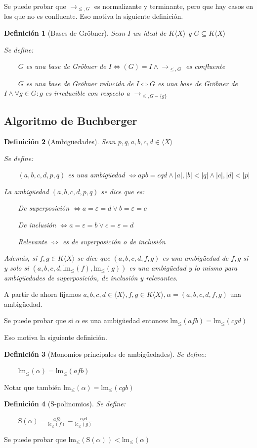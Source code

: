 \documentclass{amsbook}
\theoremstyle{customstyle}
\newtheorem{definition}{Definición}[section]
\newcommand{\definición}[2][]{
  \begin{definition}[#1]
  \setlength{\parindent}{2em} %
  #2
  \end{definition}
}
\begin{document}
Se puede probar que $→_{≤, G}$ es normalizante y terminante, pero que hay casos en los que no es confluente. Eso motiva la siguiente definición.

\definición[Bases de Gröbner] {
Sean $I$ un ideal de $K⟨X⟩$ y $G ⊆ K⟨X⟩$

Se define:

    $G$ es una base de Gröbner de $I ⇔ (G) = I ∧ →_{≤, G}$ es confluente

    $G$ es una base de Gröbner reducida de $I ⇔ G$ es una base de Gröbner de $I ∧ ∀g ∈ G : g$ es irreducible con respecto a $→_{≤, G - \{g\}}$

}

\subsection{Algoritmo de Buchberger}

\definición[Ambigüedades] {
Sean $p, q, a, b, c, d ∈ ⟨X⟩$

Se define:

    $(a, b, c, d, p, q)$ es una ambigüedad $ ⇔ apb = cqd ∧ |a|, |b| < |q| ∧ |c|, |d| < |p|$

La ambigüedad $(a, b, c, d, p, q)$ se dice que es:

    De superposición $⇔ a = ε = d ∨ b = ε = c$

    De inclusión $⇔ a = ε = b ∨ c = ε = d$

    Relevante $⇔$ es de superposición o de inclusión

Además, si $f, g ∈ K⟨X⟩$ se dice que $(a, b, c, d, f, g)$ es una ambigüedad de $f, g$ si y solo si $(a, b, c, d, \text{lm}_≤{(f)}, \text{lm}_≤{(g)})$ es una ambigüedad y lo mismo para ambigüedades de superposición, de inclusión y relevantes.

}

A partir de ahora fijamos $a, b, c, d ∈ ⟨X⟩, f, g ∈ K⟨X⟩, α = (a, b, c, d, f, g)$ una ambigüedad.

Se puede probar que si $α$ es una ambigüedad entonces $\text{lm}_≤{(afb)} = \text{lm}_≤{(cgd)}$

Eso motiva la siguiente definición.

\definición[Monomios principales de ambigüedades] {
Se define:

    $\text{lm}_≤{(α)} = \text{lm}_≤{(afb)}$
}
Notar que también $\text{lm}_≤{(α)} = \text{lm}_≤{(cgb)}$

\definición[S-polinomios] {
Se define:

    $\text{S}(α) = \frac{afb}{\text{lc}_≤{(f)}} - \frac{cgd}{\text{lc}_≤{(g)}}$
}
Se puede probar que $\text{lm}_≤{(\text{S}(α))} < \text{lm}_≤{(α)}$
\end{document}
